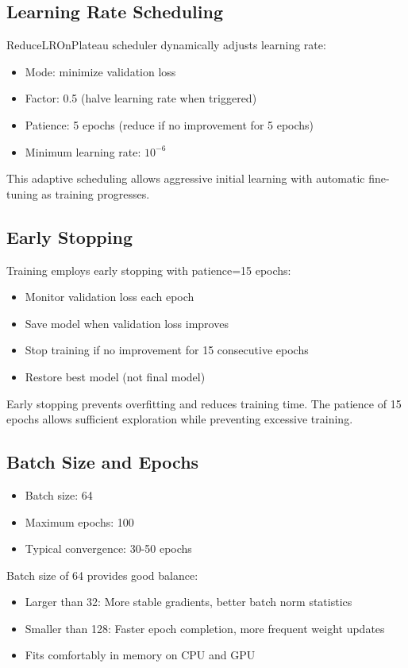 \documentclass[12pt,a4paper]{report}
\begin{document}
\subsection{Learning Rate Scheduling}

ReduceLROnPlateau scheduler dynamically adjusts learning rate:
\begin{itemize}
    \item Mode: minimize validation loss
    \item Factor: 0.5 (halve learning rate when triggered)
    \item Patience: 5 epochs (reduce if no improvement for 5 epochs)
    \item Minimum learning rate: $10^{-6}$
\end{itemize}

This adaptive scheduling allows aggressive initial learning with automatic fine-tuning as training progresses.

\subsection{Early Stopping}

Training employs early stopping with patience=15 epochs:
\begin{itemize}
    \item Monitor validation loss each epoch
    \item Save model when validation loss improves
    \item Stop training if no improvement for 15 consecutive epochs
    \item Restore best model (not final model)
\end{itemize}

Early stopping prevents overfitting and reduces training time. The patience of 15 epochs allows sufficient exploration while preventing excessive training.

\subsection{Batch Size and Epochs}

\begin{itemize}
    \item Batch size: 64
    \item Maximum epochs: 100
    \item Typical convergence: 30-50 epochs
\end{itemize}

Batch size of 64 provides good balance:
\begin{itemize}
    \item Larger than 32: More stable gradients, better batch norm statistics
    \item Smaller than 128: Faster epoch completion, more frequent weight updates
    \item Fits comfortably in memory on CPU and GPU
\end{itemize}
\end{document}
